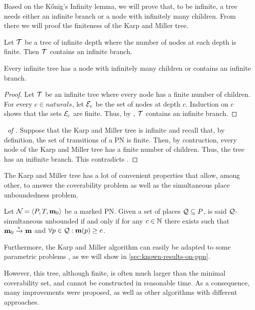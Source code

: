 Based on the Kőnig's Infinity lemma, we will prove that, to be infinite, a tree needs either an infinite branch or a node with infinitely many children.
From there we will proof the finiteness of the Karp and Miller tree.

\begin{lemm}
	\label{theo:konig}
	Let $\mathcal{T}$ be a tree of infinite depth where the number of nodes at each depth is finite.
	Then $\mathcal{T}$ contains an infinite branch.
\end{lemm}

\begin{lemm}
  \label{theo:false-konig}
  Every infinite tree has a node with infinitely many children or contains an infinite branch.
\end{lemm}

\begin{proof}%
  Let $\mathcal{T}$ be an infinite tree where every node has a finite number of children.
  For every $c \in naturals$, let $\mathcal{E}_c$ be the set of nodes at depth $c$.
	Induction on $c$ shows that the sets $\mathcal{E}_c$ are finite.
	Thus, by , $\mathcal{T}$ contains an infinite branch.
\end{proof}

\begin{proof}[\proofname\ of ]
  Suppose that the Karp and Miller tree is infinite
  and recall that, by definition, the set of transitions of a PN is finite.
	Then, by contruction, every node of the Karp and Miller tree has a finite number of children.
  Thus, the tree has an inifinite branch.
  This contradicts .
\end{proof}

 
The Karp and Miller tree has a lot of convenient properties that allow, among other, to answer the coverability problem as well as the simultaneous place unboundedness problem.

\begin{defi}
  Let $\defPN$ be a marked \ac{PN}.
  Given a set of places $\mathcal{Q} \subseteq P$, \namePN is said $\mathcal{Q}$-simultaneous unbounded if and only if for any $c \in \mathbb{N}$ there exists \mar such that $\mathbf{m}_0 \xrightarrow{*}_{} \mathbf{m}$ and $\forall p \in \mathcal{Q} : \mathbf{m}(p) \geq c$.
\end{defi}

Furthermore, the Karp and Miller algorithm can easily be adapted to some parametric problems \cite{David17}, as we will show in \autoref{sec:known-results-on-ppn}.

However, this tree, although finite, is often much larger than the minimal coverability set, and cannot be constructed in reasonable time.
As a consequence, many improvements were proposed, as well as other algorithms with different approaches.
